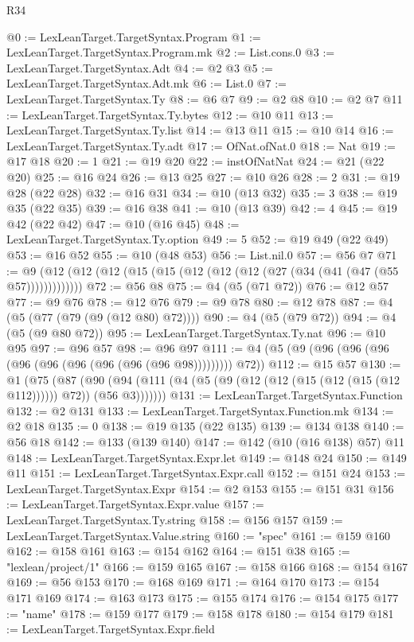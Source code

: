\begin{lexlean}{R34}
\begin{coremodule}
@0 := LexLeanTarget.TargetSyntax.Program
@1 := LexLeanTarget.TargetSyntax.Program.mk
@2 := List.cons.{0}
@3 := LexLeanTarget.TargetSyntax.Adt
@4 := @2 @3
@5 := LexLeanTarget.TargetSyntax.Adt.mk
@6 := List.{0}
@7 := LexLeanTarget.TargetSyntax.Ty
@8 := @6 @7
@9 := @2 @8
@10 := @2 @7
@11 := LexLeanTarget.TargetSyntax.Ty.bytes
@12 := @10 @11
@13 := LexLeanTarget.TargetSyntax.Ty.list
@14 := @13 @11
@15 := @10 @14
@16 := LexLeanTarget.TargetSyntax.Ty.adt
@17 := OfNat.ofNat.{0}
@18 := Nat
@19 := @17 @18
@20 := 1
@21 := @19 @20
@22 := instOfNatNat
@24 := @21 (@22 @20)
@25 := @16 @24
@26 := @13 @25
@27 := @10 @26
@28 := 2
@31 := @19 @28 (@22 @28)
@32 := @16 @31
@34 := @10 (@13 @32)
@35 := 3
@38 := @19 @35 (@22 @35)
@39 := @16 @38
@41 := @10 (@13 @39)
@42 := 4
@45 := @19 @42 (@22 @42)
@47 := @10 (@16 @45)
@48 := LexLeanTarget.TargetSyntax.Ty.option
@49 := 5
@52 := @19 @49 (@22 @49)
@53 := @16 @52
@55 := @10 (@48 @53)
@56 := List.nil.{0}
@57 := @56 @7
@71 := @9 (@12 (@12 (@12 (@15 (@15 (@12 (@12 (@12 (@27 (@34 (@41 (@47 (@55 @57)))))))))))))
@72 := @56 @8
@75 := @4 (@5 (@71 @72))
@76 := @12 @57
@77 := @9 @76
@78 := @12 @76
@79 := @9 @78
@80 := @12 @78
@87 := @4 (@5 (@77 (@79 (@9 (@12 @80) @72))))
@90 := @4 (@5 (@79 @72))
@94 := @4 (@5 (@9 @80 @72))
@95 := LexLeanTarget.TargetSyntax.Ty.nat
@96 := @10 @95
@97 := @96 @57
@98 := @96 @97
@111 := @4 (@5 (@9 (@96 (@96 (@96 (@96 (@96 (@96 (@96 (@96 (@96 @98))))))))) @72))
@112 := @15 @57
@130 := @1
    (@75
      (@87 (@90 (@94 (@111 (@4 (@5 (@9 (@12 (@12 (@15 (@12 (@15 (@12 @112)))))) @72)) (@56 @3)))))))
@131 := LexLeanTarget.TargetSyntax.Function
@132 := @2 @131
@133 := LexLeanTarget.TargetSyntax.Function.mk
@134 := @2 @18
@135 := 0
@138 := @19 @135 (@22 @135)
@139 := @134 @138
@140 := @56 @18
@142 := @133 (@139 @140)
@147 := @142 (@10 (@16 @138) @57) @11
@148 := LexLeanTarget.TargetSyntax.Expr.let
@149 := @148 @24
@150 := @149 @11
@151 := LexLeanTarget.TargetSyntax.Expr.call
@152 := @151 @24
@153 := LexLeanTarget.TargetSyntax.Expr
@154 := @2 @153
@155 := @151 @31
@156 := LexLeanTarget.TargetSyntax.Expr.value
@157 := LexLeanTarget.TargetSyntax.Ty.string
@158 := @156 @157
@159 := LexLeanTarget.TargetSyntax.Value.string
@160 := "spec"
@161 := @159 @160
@162 := @158 @161
@163 := @154 @162
@164 := @151 @38
@165 := "lexlean/project/1"
@166 := @159 @165
@167 := @158 @166
@168 := @154 @167
@169 := @56 @153
@170 := @168 @169
@171 := @164 @170
@173 := @154 @171 @169
@174 := @163 @173
@175 := @155 @174
@176 := @154 @175
@177 := "name"
@178 := @159 @177
@179 := @158 @178
@180 := @154 @179
@181 := LexLeanTarget.TargetSyntax.Expr.field

\end{coremodule}
\end{lexlean}
